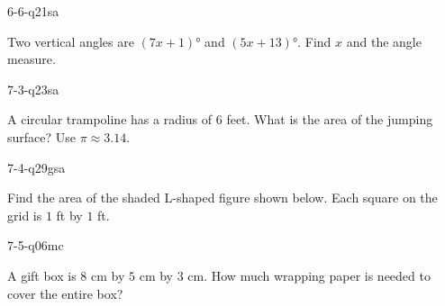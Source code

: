 \begin{practiceQuestion}{6-6-q21}{sa}
\begin{questionText}
Two vertical angles are $(7x + 1)°$ and $(5x + 13)°$. Find $x$ and the angle measure.
\end{questionText}
\end{practiceQuestion}

\begin{practiceQuestion}{7-3-q23}{sa}
\begin{questionText}
A circular trampoline has a radius of $6$ feet. What is the area of the jumping surface? Use $\pi \approx 3.14$.
\end{questionText}
\end{practiceQuestion}

\begin{practiceQuestion}{7-4-q29}{gsa}
\begin{questionText}
Find the area of the shaded L-shaped figure shown below. Each square on the grid is $1$ ft by $1$ ft.

\begin{center}
\end{center}
\end{questionText}
\end{practiceQuestion}

\begin{practiceQuestion}{7-5-q06}{mc}
\begin{questionText}
A gift box is $8$ cm by $5$ cm by $3$ cm. How much wrapping paper is needed to cover the entire box?
\end{questionText}
\end{practiceQuestion}

